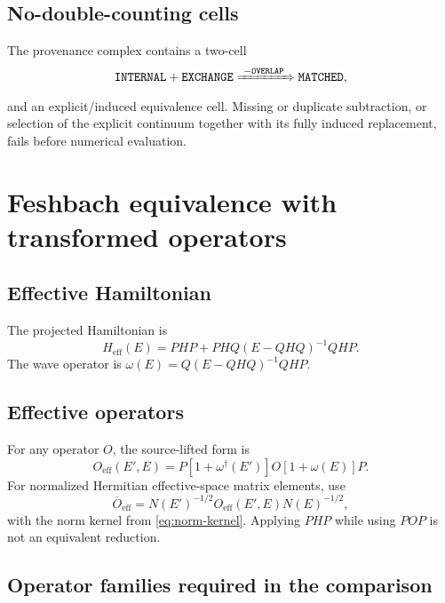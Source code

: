 \documentclass[11pt]{article}
\newcommand{\eff}{\mathrm{eff}}
\begin{document}
\subsection{No-double-counting cells}

The provenance complex contains a two-cell
\begin{equation}
 \texttt{INTERNAL}+\texttt{EXCHANGE}
 \xRightarrow{\ -\texttt{OVERLAP}\ }
 \texttt{MATCHED},
 \label{eq:overlap-two-cell}
\end{equation}
and an explicit/induced equivalence cell.  Missing or duplicate subtraction,
or selection of the explicit continuum together with its fully induced
replacement, fails before numerical evaluation.

\section{Feshbach equivalence with transformed operators}
\label{sec:feshbach}

\subsection{Effective Hamiltonian}

The projected Hamiltonian is
\begin{equation}
 H_{\eff}(E)
 =PHP+PHQ(E-QHQ)^{-1}QHP.
 \label{eq:heff}
\end{equation}
The wave operator is \(\omega(E)=Q(E-QHQ)^{-1}QHP\).

\subsection{Effective operators}

For any operator \(O\), the source-lifted form is
\begin{equation}
 O_{\eff}(E',E)
 =P[1+\omega^{\dagger}(E')]O[1+\omega(E)]P.
 \label{eq:oeff}
\end{equation}
For normalized Hermitian effective-space matrix elements, use
\begin{equation}
 \overline O_{\eff}
 =N(E')^{-1/2}O_{\eff}(E',E)N(E)^{-1/2},
 \label{eq:metric-oeff}
\end{equation}
with the norm kernel from \cref{eq:norm-kernel}.  Applying \(PHP\) while using
\(POP\) is not an equivalent reduction.

\subsection{Operator families required in the comparison}
\end{document}
